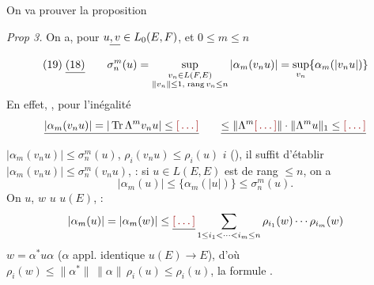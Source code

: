 \documentclass[11pt,a4paper]{article}
\begin{document}
On va prouver la proposition  

\emph{Prop 3.} On a, pour $u \struck{, v} \in L_0(E,F)$, et $0 \leq m \leq n$
\[
  \text{(19)}\; \struck{\text{(18)}}\qquad \sigma_n^{m}(u) = \sup_{\substack{v_n \in L(F,E) \\ \|v_n\| \leq 1,\; \operatorname{rang} v_n \leq n}} |\alpha_m(v_n u)| = \sup_{v_n} \{\alpha_m(|v_n u|)\}
\]
\struck{\ill{}} En effet,  \ill{}, pour  l'inégalité
\[
  \struck{|\alpha_m(v_n u)| = |\operatorname{Tr} \Lambda^{m} v_n u| \leq \ill{}} \qquad \struck{\leq \|\Lambda^{m} \ill{}\| \cdot \|\Lambda^{m} u\|_1 \leq \ill{}}
\]
 $|\alpha_m(v_n u)| \leq \sigma_n^{m}(u)$,    $\rho_i(v_n u) \leq \rho_i(u)$   $i$ (\ill{}), il suffit d'établir $|\alpha_m(v_n u)| \leq \sigma_n^{m}(v_n u)$,     : si $u \in L(E,E)$ est de rang $\leq n$, on a
\[
  |\alpha_m(u)| \leq \{\alpha_m(|u|)\} \leq \sigma_n^{m}(u).
\]
On \ill{} $u$,  $w$     $u$  $u(E)$,  :
\[
  |\alpha_m(u)| = |\alpha_m(w)| \leq \struck{\ill{}} \sum_{1 \leq i_1 < \cdots < i_m \leq n} \rho_{i_1}(w) \cdots \rho_{i_m}(w)
\]
 \ill{} \struck{\ill{}} $w = \alpha^{*} u \alpha$ ($\alpha$ appl. identique $u(E) \to E$), d'où $\rho_i(w) \leq \|\alpha^{*}\|\, \|\alpha\|\, \rho_i(u) \leq \rho_i(u)$, la formule .
\end{document}
